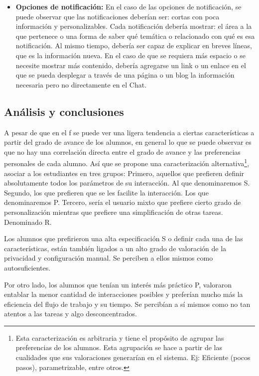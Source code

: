\begin{itemize}
        \item \textbf{Opciones de notificación:} En el caso de las opciones de notificación, se puede observar que las notificaciones deberían ser: cortas con poca información y personalizables. Cada notificación debería mostrar: el área a la que pertenece o una forma de saber qué temática o relacionado con qué es esa notificación. Al mismo tiempo, debería ser capaz de explicar en breves líneas, que es la información nueva. En el caso de que se requiera más espacio o se necesite mostrar más contenido, debería agregarse un link o un enlace en el que se pueda desplegar a través de una página o un blog la información necesaria pero no directamente en el Chat.
        
    \end{itemize}

    \subsection{Análisis y conclusiones}\label{ayd:analsis_y_conclusiones}
    
    \par A pesar de que en el \acrlong{f} se puede ver una ligera tendencia a ciertas características a partir del grado de avance de los alumnos, en general lo que se puede observar es que no hay una correlación directa entre el grado de avance y las preferencias personales de cada alumno. Así que se propone una caracterización alternativa\footnote{Esta caracterización es arbitraria y tiene el propósito de agrupar las preferencias de los alumnos. Esta agrupación se hace a partir de las cualidades que sus valoraciones generarían en el sistema. Ej: Eficiente (pocos pasos), parametrizable, entre otros.}, asociar a los estudiantes en tres grupos: Primero, aquellos que prefieren definir absolutamente todos los parámetros de su interacción. Al que denominaremos \acrfull{S}. Segundo, los que prefieren que se les facilite la interacción. Los que denominaremos \acrfull{P}. Tercero, sería el usuario mixto que prefiere cierto grado de personalización mientras que prefiere una simplificación de otras tareas. Denominado \acrfull{R}.
    
    \par Los alumnos que prefirieron una alta especificación \acrshort{S} o definir cada una de las características, están también ligados a un alto grado de valoración de la privacidad y configuración manual. Se perciben a ellos mismos como autosuficientes.
    
    \par Por otro lado, los alumnos que tenían un interés más práctico \acrshort{P}, valoraron entablar la menor cantidad de interacciones posibles y preferían mucho más la eficiencia del flujo de trabajo y su tiempo. Se percibían a sí mismos como no tan atentos a las tareas y algo desconcentrados.

